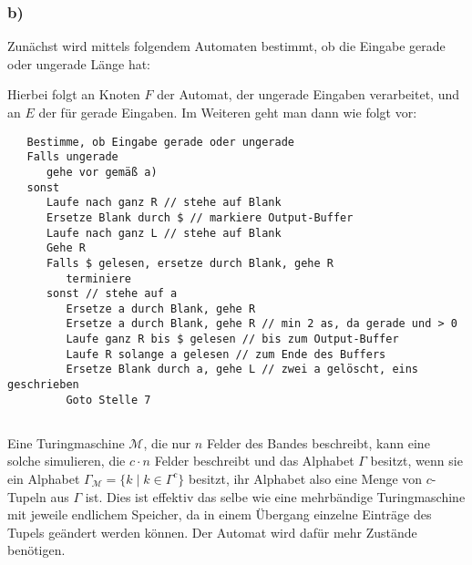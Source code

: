 \documentclass{article}
\begin{document}
\subsubsection{b)}

Zunächst wird mittels folgendem Automaten bestimmt, ob die Eingabe gerade oder
ungerade Länge hat:

\begin{center}
\end{center}

Hierbei folgt an Knoten $F$ der Automat, der ungerade Eingaben verarbeitet, und
an $E$ der für gerade Eingaben. Im Weiteren geht man dann wie folgt vor:

\begin{lstlisting}
   Bestimme, ob Eingabe gerade oder ungerade
   Falls ungerade
      gehe vor gemäß a)
   sonst
      Laufe nach ganz R // stehe auf Blank
      Ersetze Blank durch $ // markiere Output-Buffer
      Laufe nach ganz L // stehe auf Blank
      Gehe R
      Falls $ gelesen, ersetze durch Blank, gehe R
         terminiere
      sonst // stehe auf a
         Ersetze a durch Blank, gehe R
         Ersetze a durch Blank, gehe R // min 2 as, da gerade und > 0
         Laufe ganz R bis $ gelesen // bis zum Output-Buffer
         Laufe R solange a gelesen // zum Ende des Buffers
         Ersetze Blank durch a, gehe L // zwei a gelöscht, eins geschrieben
         Goto Stelle 7
\end{lstlisting}

\subsection{} 

Eine Turingmaschine $\mathcal{M}$, die nur $n$ Felder des Bandes beschreibt, kann eine solche
simulieren, die $c\cdot n$ Felder beschreibt und das Alphabet $\Gamma$ besitzt,
wenn sie ein Alphabet $\Gamma_\mathcal{M} = \{k \mid k \in \Gamma^c\}$ besitzt,
ihr Alphabet also eine Menge von $c$-Tupeln aus $\Gamma$ ist. Dies ist effektiv
das selbe wie eine mehrbändige Turingmaschine mit jeweile endlichem Speicher, da
in einem Übergang einzelne Einträge des Tupels geändert werden können. Der
Automat wird dafür mehr Zustände benötigen.
\end{document}
